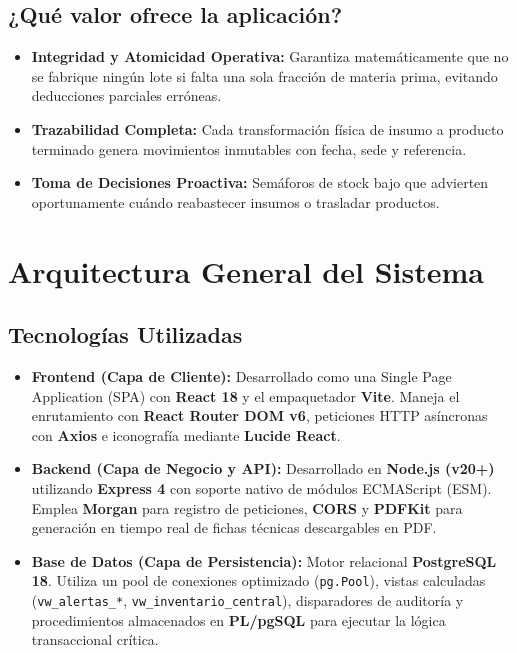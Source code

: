 \documentclass[11pt,a4paper]{article}
\begin{document}
\subsection{¿Qué valor ofrece la aplicación?}
\begin{itemize}
    \item \textbf{Integridad y Atomicidad Operativa:} Garantiza matemáticamente que no se fabrique ningún lote si falta una sola fracción de materia prima, evitando deducciones parciales erróneas.
    \item \textbf{Trazabilidad Completa:} Cada transformación física de insumo a producto terminado genera movimientos inmutables con fecha, sede y referencia.
    \item \textbf{Toma de Decisiones Proactiva:} Semáforos de stock bajo que advierten oportunamente cuándo reabastecer insumos o trasladar productos.
\end{itemize}

\section{Arquitectura General del Sistema}

\subsection{Tecnologías Utilizadas}
\begin{itemize}
    \item \textbf{Frontend (Capa de Cliente):} Desarrollado como una Single Page Application (SPA) con \textbf{React 18} y el empaquetador \textbf{Vite}. Maneja el enrutamiento con \textbf{React Router DOM v6}, peticiones HTTP asíncronas con \textbf{Axios} e iconografía mediante \textbf{Lucide React}.
    \item \textbf{Backend (Capa de Negocio y API):} Desarrollado en \textbf{Node.js (v20+)} utilizando \textbf{Express 4} con soporte nativo de módulos ECMAScript (ESM). Emplea \textbf{Morgan} para registro de peticiones, \textbf{CORS} y \textbf{PDFKit} para generación en tiempo real de fichas técnicas descargables en PDF.
    \item \textbf{Base de Datos (Capa de Persistencia):} Motor relacional \textbf{PostgreSQL 18}. Utiliza un pool de conexiones optimizado (\texttt{pg.Pool}), vistas calculadas (\texttt{vw\_alertas\_*}, \texttt{vw\_inventario\_central}), disparadores de auditoría y procedimientos almacenados en \textbf{PL/pgSQL} para ejecutar la lógica transaccional crítica.
\end{itemize}
\end{document}
